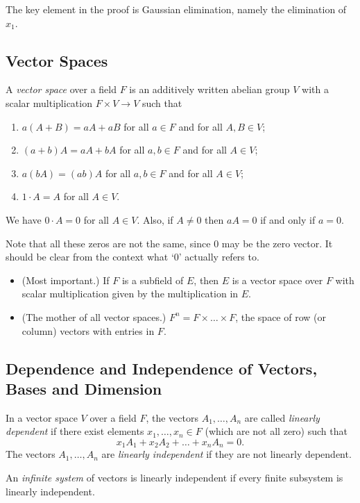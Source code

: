 \begin{remark}
	The key element in the proof is Gaussian elimination, namely the elimination of $x_1$.
\end{remark}

\subsection{Vector Spaces}
\begin{definition}
	A \emph{vector space} over a field $F$ is an additively written abelian group $V$ with a scalar multiplication $F \times V \to V$ such that
	\begin{enumerate}
		\item $a(A + B) = aA + aB$ \qquad for all $a \in F$ and for all $A, B \in V$;
		\item $(a + b)A = aA + bA$ \qquad for all $a, b \in F$ and for all $A \in V$;
		\item $a(bA) = (ab)A$ \qquad for all $a, b \in F$ and for all $A \in V$;
		\item $1 \cdot A = A$ \qquad for all $A \in V$.
	\end{enumerate}
\end{definition}

\begin{remark}
	We have $0 \cdot A = 0$ for all $A \in V$. Also, if $A \neq 0$ then $aA = 0$ if and only if $a = 0$.
	
	Note that all these zeros are not the same, since 0 may be the zero vector. It should be clear from the context what `0' actually refers to.
\end{remark}

\begin{examples}\hfill
	\begin{itemize}
		\item (Most important.) If $F$ is a subfield of $E$, then $E$ is a vector space over $F$ with scalar multiplication given by the multiplication in $E$.
		\item (The mother of all vector spaces.) $F^n = F \times \ldots \times F$, the space of row (or column) vectors with entries in $F$.
	\end{itemize}
\end{examples}

\subsection{Dependence and Independence of Vectors, Bases and Dimension}
\begin{definition}
	In a vector space $V$ over a field $F$, the vectors $A_1, \ldots, A_n$ are called \emph{linearly dependent} if there exist elements $x_1, \ldots, x_n \in F$ (which are not all zero) such that
	\[
		x_1 A_1 + x_2 A_2 + \ldots + x_n A_n = 0.
	\]
	The vectors $A_1, \ldots, A_n$ are \emph{linearly independent} if they are not linearly dependent.
	
	An \emph{infinite system} of vectors is linearly independent if every finite subsystem is linearly independent.
\end{definition}


